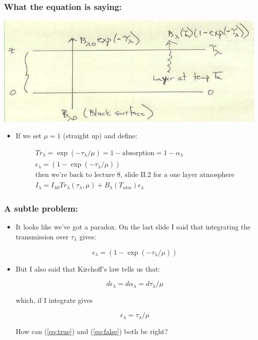 \documentclass[hyperref={colorlinks=true,linkcolor=blue,urlcolor=blue},numbers]{beamer}
\newcommand{\rad}{%
   \ensuremath{I}
}
\newcommand{\trans}{%
   \ensuremath{Tr}
}
\newcommand{\abs}{%
   \ensuremath{\alpha}
}
\begin{document}
\begin{frame}
  \frametitle{What the equation is saying:}

  \includegraphics[width=\textwidth]{fig_isothermal}

  \begin{itemize}
  \item If we set $\mu=1$ (straight up) and define:

    \begin{gather*}
  \trans_\lambda = \exp( -\tau_\lambda
/\mu ) = 1 - \mathrm{absorption} = 1 - \abs_\lambda \\
        \epsilon_\lambda = (1 - \exp( -\tau_\lambda / \mu))\\
\text{then we're back to lecture 8, slide II.2 for a one layer atmosphere}\\
  \rad_\lambda = \rad_{\lambda 0} Tr_\lambda(\tau_\lambda ,\mu ) + B_\lambda (T_{atm}) \epsilon_\lambda
    \end{gather*}

\end{itemize}
\end{frame}

\begin{frame}
  \frametitle{A subtle problem: }

  \begin{itemize}
  \item It looks like we've got a paradox.  On the last slide I said that integrating the transmission
over $\tau_\lambda$ gives:

    \begin{equation}
\label{eq:true}
              \epsilon_\lambda = (1 - \exp( -\tau_\lambda / \mu))
    \end{equation}


  \item But I also said that Kirchoff's law tells us that:

    \begin{equation*}
            d\epsilon_\lambda =  d\alpha_\lambda=d\tau_\lambda/\mu
    \end{equation*}

which, if I integrate gives 

    \begin{equation}
\label{eq:false}
              \epsilon_\lambda = \tau_\lambda/\mu
    \end{equation}

How can (\ref{eq:true}) and (\ref{eq:false}) both be right?


  \end{itemize}

\end{frame}
\end{document}
